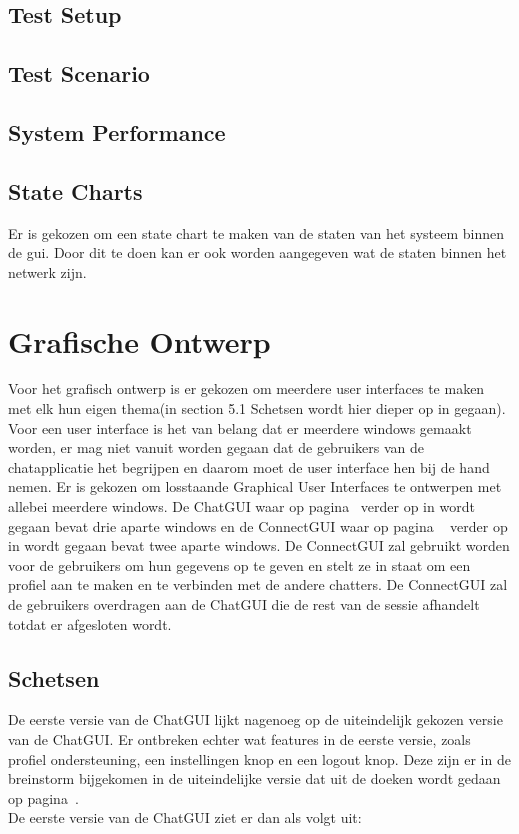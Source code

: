 \documentclass[12pt]{article}
\begin{document}
\subsection{Test Setup}


\subsection{Test Scenario}


\subsection{System Performance}


\subsection{State Charts}
Er is gekozen om een state chart te maken van de staten van het systeem binnen de gui. Door dit te doen kan er ook worden aangegeven wat de staten binnen het netwerk zijn.

\newpage

\section{Grafische Ontwerp}
\label{aangegeven}
Voor het grafisch ontwerp is er gekozen om meerdere user interfaces te maken met elk hun eigen thema(in section 5.1 Schetsen wordt hier dieper op in gegaan). Voor een user interface is het van belang dat er meerdere windows gemaakt worden, er mag niet vanuit worden gegaan dat de gebruikers van de chatapplicatie het begrijpen en daarom moet de user interface hen bij de hand nemen.  Er is gekozen om losstaande Graphical User Interfaces te ontwerpen met allebei meerdere windows. De ChatGUI waar op pagina~\pageref{ChatGUI} verder op in wordt gegaan bevat drie aparte windows en de ConnectGUI waar op pagina ~\pageref{ConnectGUI} verder op in wordt gegaan bevat twee aparte windows. De ConnectGUI zal gebruikt worden voor de gebruikers om hun gegevens op te geven en stelt ze in staat om een profiel aan te maken en te verbinden met de andere chatters. De ConnectGUI zal de gebruikers overdragen aan de ChatGUI die de rest van de sessie afhandelt totdat er afgesloten wordt.

\subsection{Schetsen}
De eerste versie van de ChatGUI lijkt nagenoeg op de uiteindelijk gekozen versie van de ChatGUI. Er ontbreken echter wat features in de eerste versie, zoals profiel ondersteuning, een instellingen knop en een  logout knop. Deze zijn er in de breinstorm bijgekomen in de uiteindelijke versie dat uit de doeken wordt gedaan op pagina~\pageref{Chat Window}. \\
De eerste versie van de ChatGUI ziet er dan als volgt uit:
\\
\end{document}
